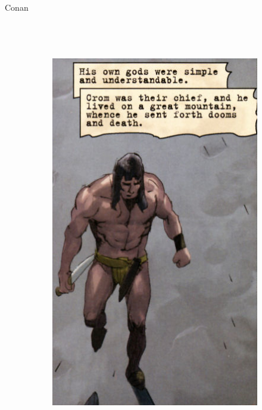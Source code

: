 \begin{frame}{Conan}
\begin{columns}
\begin{figure}[htp]
\begin{subfigure}[b]{0.3\textwidth}
			\end{subfigure}
			~
			\begin{subfigure}[b]{0.27\textwidth}
				\includegraphics[width=\textwidth]{img/conan/DH}
			\end{subfigure}
			~
			\begin{subfigure}[b]{0.23\textwidth}

\end{subfigure}
\end{figure}
\end{columns}
\end{frame}
